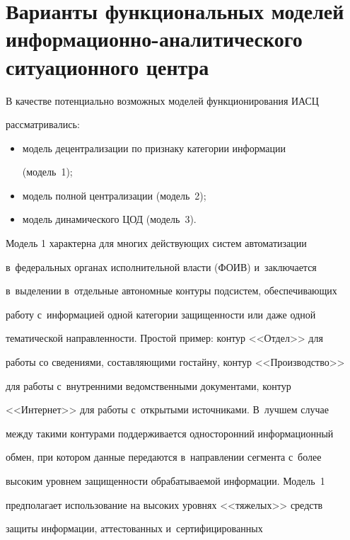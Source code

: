 \section{Варианты функциональных моделей информационно-аналитического ситуационного центра}





В качестве потенциально возможных моделей функционирования ИАСЦ 


рассматривались:


\begin{itemize}


\item модель децентрализации по признаку категории информации 


(модель~1);


\item модель полной централизации (модель~2);


\item модель динамического ЦОД (модель~3).


\end{itemize}





Модель 1 характерна для многих действующих систем автоматизации 


в~федеральных органах исполнительной власти (ФОИВ) и~заключается 


в~выделении в~отдельные автономные контуры подсистем, обеспечивающих 


работу с~информацией одной категории защищенности или даже одной 


тематической направленности. Простой пример: контур <<Отдел>> для 


работы со сведениями, составляющими гостайну, контур <<Производство>> 


для работы с~внутренними ведомственными документами, контур 


<<Интернет>> для работы с~открытыми источниками. В~лучшем случае 


между такими контурами поддерживается односторонний информационный 


обмен, при котором данные передаются в~направлении сегмента с~более 


высоким уровнем защищенности обрабатываемой информации. Модель~1 


предполагает использование на высоких уровнях <<тяжелых>> средств 


защиты информации, аттестованных и~сертифицированных 


